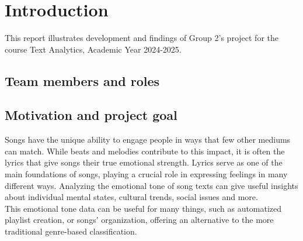 \chapter*{Introduction}
\label{ch:Introduction}
This report illustrates development and findings of Group 2's project for
the course Text Analytics, Academic Year 2024-2025.

\section*{Team members and roles}


\section*{Motivation and project goal}
Songs have the unique ability to engage people in ways that few other
mediums can match. While beats and melodies contribute to this impact,
it is often the lyrics that give songs their true emotional strength.
Lyrics serve as one of the main foundations of songs, playing
a crucial role in expressing feelings in many different ways.
Analyzing the emotional tone of song texts can give useful insights about individual mental states,
cultural trends, social issues and more.\\
This emotional tone data can be useful
for many things, such as automatized playlist creation, or songs' organization,
offering an alternative to the more traditional genre-based classification.\\

